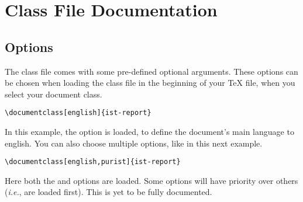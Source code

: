 \documentclass[palatino,english]{ist-report}
\begin{document}
\section{Class File Documentation}

\subsection{Options}

The class file comes with some pre-defined optional arguments. These options can be chosen when loading the class file in the beginning of your \TeX{} file, when you select your document class.
\begin{verbatim}
\documentclass[english]{ist-report}
\end{verbatim}
In this example, the  option is loaded, to define the document's main language to english. You can also choose multiple options, like in this next example.
\begin{verbatim}
\documentclass[english,purist]{ist-report}
\end{verbatim}
Here both the  and  options are loaded. Some options will have priority over others (\textit{i.e.}, are loaded first). This is yet to be fully documented.
\end{document}
